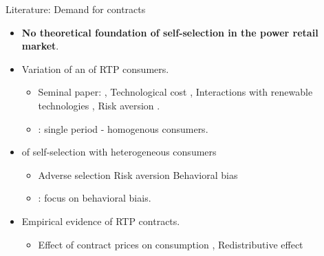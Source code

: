 \documentclass{class}
\begin{document}
\begin{frame}{Literature: Demand for contracts}\label{Lit_Conso}

\begin{itemize}
    \item \textbf{No theoretical foundation of self-selection in the power retail market}.

    \vfill
    
    \item Variation of an  of RTP consumers.
    \begin{itemize}
        \item Seminal paper: \cite{Borenstein2005b}, Technological cost \cite{Leautier2014},  Interactions with renewable technologies \cite{Ambec2021}, Risk aversion \cite{Boom2021}.
        \item {}: single period - homogenous consumers. 
    \end{itemize}

 \vfill

    \item {} of self-selection with heterogeneous consumers
    \begin{itemize}
        \item Adverse selection \cite{Ito2023} Risk aversion \cite{Qiu2018} Behavioral bias \cite{Hortacsu2017,Fowlie2021}
        \item {}: focus on behavioral biais.
    \end{itemize}


\vfill
    \item Empirical evidence of RTP contracts.
    
    \begin{itemize}
        \item Effect of contract prices on consumption \cite{Fabra2021,Han2023,Enrich2024,Fu2024}, Redistributive effect \cite{Leslie2021, Levinson2022a, Cahana2023}
    \end{itemize}


     
    
\end{itemize}

\vfill

\hyperlink{FirstCont}{}

\end{frame}

\end{document}
